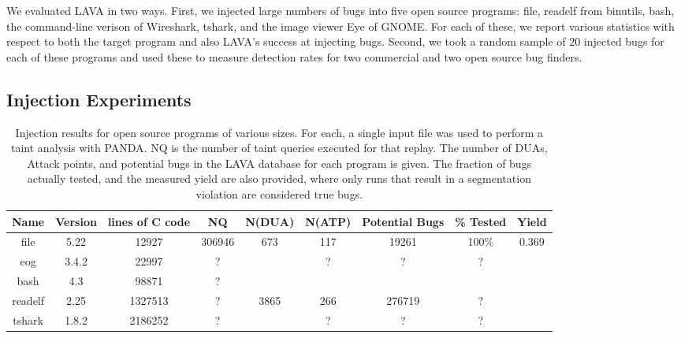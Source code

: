 
\label{section:results}

We evaluated LAVA in two ways.
First, we injected large numbers of bugs into five open source programs: file, readelf from binutils, bash, the command-line verison of Wireshark, tshark, and the image viewer Eye of GNOME.
For each of these, we report various statistics with respect to both the target program and also LAVA's success at injecting bugs. 
Second, we took a random sample of 20 injected bugs for each of these programs and used these to measure detection rates for two commercial and two open source bug finders.

\subsection{Injection Experiments}


\begin{table*}[t]
\centering
\begin{tabular}{c|c|c|c|c|c|c|c|c} 
Name    & Version & lines of C code & NQ      &  N(DUA) & N(ATP) & Potential Bugs & \% Tested & Yield \\ \hline
file    & 5.22    & 12927           & 306946  & 673     & 117    & 19261          & 100\%     & 0.369  \\
eog     & 3.4.2   & 22997           & ?       &         & ?      & ?              & ?         &  \\
bash    & 4.3     & 98871           & ?       &         &        &                &           &  \\
readelf & 2.25    & 1327513         & ?       &  3865   & 266    & 276719         & ?         &  \\
tshark  & 1.8.2   & 2186252         & ?       &         & ?      & ?              & ?         &  \\
\end{tabular}
\caption{Injection results for open source programs of various sizes.
For each, a single input file was used to perform a taint analysis with PANDA.
NQ is the number of taint queries executed for that replay.
The number of DUAs, Attack points, and potential bugs in the LAVA database for each program is given.
The fraction of bugs actually tested, and the measured yield are also provided, where only runs that result in a segmentation violation are considered true bugs.
}
\end{table*}


